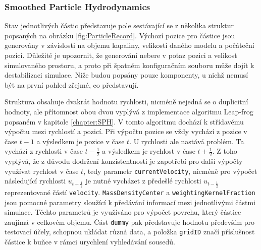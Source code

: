 \subsubsection{Smoothed Particle Hydrodynamics}
Stav jednotlivých částic představuje pole sestávající se z několika struktur popsaných na obrázku \ref{fig:ParticleRecord}. Výchozí pozice pro částice jsou generovány v závislosti na objemu kapaliny, velikosti daného modelu a počáteční pozici. Důležité je upozornit, že generování nebere v potaz pozici a velikost simulovaného prostoru, a proto při špatném konfiguračním souboru může dojít k destabilizaci simulace. Níže budou popsány pouze komponenty, u nichž nemusí být na první pohled zřejmé, co představují. 

Struktura obsahuje dvakrát hodnotu rychlosti, nicméně nejedná se o duplicitní hodnoty, ale přítomnost obou dvou vyplývá z implementace algoritmu Leap-frog popsaném v kapitole \ref{chapter:SPH}. V tomto algoritmu dochází k střídavému výpočtu mezi rychlostí a pozicí. Při výpočtu pozice se vždy vychází z pozice v čase $t-1$ a výsledkem je pozice v čase $t$. U rychlosti ale nastává problém. Ta vychází z rychlosti v čase $t-\frac{1}{2}$ a výsledkem je rychlost v čase $t+\frac{1}{2}$. Z toho vyplývá, že z důvodu dodržení konzistentnosti je zapotřebí pro další výpočty využívat rychlost v čase $t$, tedy parametr \texttt{currentVelocity}, nicméně pro výpočet následující rychlosti $u_{t+\frac{1}{2}}$ je nutné vycházet z předešlé rychlosti $u_{t-\frac{1}{2}}$ reprezentované částí \texttt{velocity}. \texttt{MassDensityCenter} a \texttt{weightingKernelFraction} jsou pomocné parametry sloužící k předávání informací mezi jednotlivými částmi simulace. Těchto parametrů je využíváno pro výpočet povrchu, který částice zaujímá v celkovém objemu. Část \texttt{dummy} pak představuje hodnotu především pro testovací účely, schopnou ukládat různá data, a položka \texttt{gridID} značí příslušnost částice k buňce v rámci urychlení vyhledávání sousedů.

